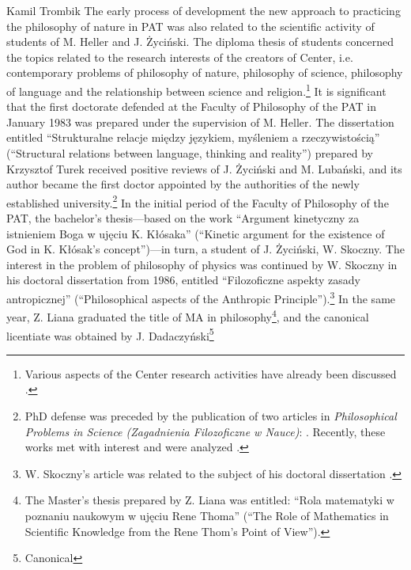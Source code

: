 \begin{artengenv}{Kamil Trombik}
The early process of development the new approach to practicing the philosophy of nature in PAT was also related to the
scientific activity of students of M. Heller and J. Życiński. The diploma thesis of students concerned the topics
related to the research interests of the creators of Center, i.e. contemporary problems of philosophy of nature,
philosophy of science, philosophy of language and the relationship between science and religion.\footnote{Various
aspects of the Center research activities have already been discussed
\parencite[see e.g.][]{krauze_jedna_2008,maczka_badania_2012,skoczny_filozofia_2012}.
} It is significant that the first doctorate defended at the Faculty of Philosophy
of the PAT in January 1983 was prepared under the supervision of M. Heller. The dissertation entitled ``Strukturalne
relacje między językiem, myśleniem a rzeczywistością'' (``Structural relations between language, thinking and reality'')
prepared by Krzysztof Turek received positive reviews of J. Życiński and M. Lubański, and its author became the first
doctor appointed by the authorities of the newly established university.\footnote{PhD defense was preceded by the
publication of two articles in \textit{Philosophical Problems in Science (Zagadnienia Filozoficzne w Nauce)}:
\parencite{turek_filozoficzne_1978,turek_rozwazania_1981}.
Recently, these works met with interest and were analyzed
\parencite{krzanowski_towards_2016}.
} In the initial period of the Faculty of Philosophy of the PAT, the
bachelor's thesis---based on the work ``Argument kinetyczny za istnieniem Boga w ujęciu K. Kłósaka'' (``Kinetic argument for
the existence of God in K. Kłósak's concept'')---in turn, a student of J. Życiński, W. Skoczny. The interest in the
problem of philosophy of physics was continued by W. Skoczny in his doctoral dissertation from 1986, entitled
``Filozoficzne aspekty zasady antropicznej'' (``Philosophical aspects of the Anthropic Principle'').\footnote{W. Skoczny's
article was related to the subject of his doctoral dissertation
\parencite{skoczny_glowne_1985}.
} In the same
year, Z. Liana graduated the title of MA in philosophy\footnote{The Master's thesis prepared by Z. Liana was entitled:
``Rola matematyki w poznaniu naukowym w ujęciu Rene Thoma'' (``The Role of Mathematics in Scientific Knowledge from the
Rene Thom's Point of View'').}, and the canonical licentiate was obtained by J. Dadaczyński\footnote{Canonical
}
\end{artengenv}
